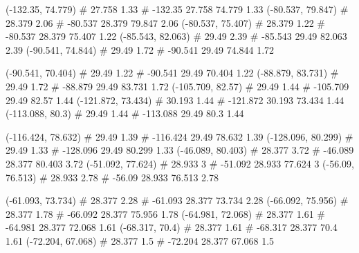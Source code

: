 \documentclass[a4paper,openbib,10pt]{article}
\newenvironment{treegraph}{\begin{graph}}{\end{graph}}
\begin{document}
\begin{treegraph}
  (-132.35, 74.779) #     27.758    1.33
   #    -132.35    27.758    74.779    1.33
  (-80.537, 79.847) #     28.379    2.06
   #    -80.537    28.379    79.847    2.06
  (-80.537, 75.407) #     28.379    1.22
   #    -80.537    28.379    75.407    1.22
  (-85.543, 82.063) #     29.49    2.39
   #    -85.543    29.49    82.063    2.39
  (-90.541, 74.844) #     29.49    1.72
   #    -90.541    29.49    74.844    1.72

  (-90.541, 70.404) #     29.49    1.22
   #    -90.541    29.49    70.404    1.22
  (-88.879, 83.731) #     29.49    1.72
   #    -88.879    29.49    83.731    1.72
  (-105.709, 82.57) #     29.49    1.44
   #    -105.709    29.49    82.57    1.44
  (-121.872, 73.434) #     30.193    1.44
   #    -121.872    30.193    73.434    1.44
  (-113.088, 80.3) #     29.49    1.44
   #    -113.088    29.49    80.3    1.44

  (-116.424, 78.632) #     29.49    1.39
   #    -116.424    29.49    78.632    1.39
  (-128.096, 80.299) #     29.49    1.33
   #    -128.096    29.49    80.299    1.33
  (-46.089, 80.403) #     28.377    3.72
   #    -46.089    28.377    80.403    3.72
  (-51.092, 77.624) #     28.933    3
   #    -51.092    28.933    77.624    3
  (-56.09, 76.513) #     28.933    2.78
   #    -56.09    28.933    76.513    2.78

  (-61.093, 73.734) #     28.377    2.28
   #    -61.093    28.377    73.734    2.28
  (-66.092, 75.956) #     28.377    1.78
   #    -66.092    28.377    75.956    1.78
  (-64.981, 72.068) #     28.377    1.61
   #    -64.981    28.377    72.068    1.61
  (-68.317, 70.4) #     28.377    1.61
   #    -68.317    28.377    70.4    1.61
  (-72.204, 67.068) #     28.377    1.5
   #    -72.204    28.377    67.068    1.5


\end{treegraph}
\end{document}
